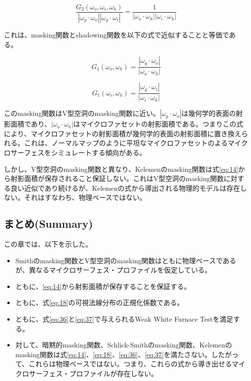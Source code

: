\documentclass[a4j,xelatex,ja=standard]{bxjsarticle}
\begin{document}
\begin{equation}
    \frac{G_2(\omega_o, \omega_i, \omega_h)}{|\omega_g \cdot \omega_o| |\omega_g \cdot \omega_i|} = \frac{1}{|\omega_o \cdot \omega_h| |\omega_i \cdot \omega_h|}
    \label{eq:58}
\end{equation}

これは、masking関数とshadowing関数を以下の式で近似することと等価である。

\begin{equation}
    G_1(\omega_o, \omega_h) = \frac{|\omega_g \cdot \omega_o|}{|\omega_o \cdot \omega_h|}
    \label{eq:59}
\end{equation}

\begin{equation}
    G_1(\omega_i, \omega_h) = \frac{|\omega_g \cdot \omega_i|}{|\omega_i \cdot \omega_h|}
    \label{eq:60}
\end{equation}

このmasking関数はV型空洞のmasking関数に近い。$|\omega_g \cdot \omega_o|$は幾何学的表面の射影面積であり、$|\omega_o \cdot \omega_h|$はマイクロファセットの射影面積である。つまりこの式により、マイクロファセットの射影面積が幾何学的表面の射影面積に置き換えられる。これは、ノーマルマップのように平坦なマイクロファセットのよるマイクロサーフェスをシミュレートする傾向がある。

しかし、V型空洞のmasking関数と異なり、Kelemenのmasking関数は式\eqref{eq:14}から射影面積が保存されること保証しない。これはV型空洞のmasking関数に対する良い近似であり続けるが、Kelemenの式から導出される物理的モデルは存在しない。それはすなわち、物理ベースではない。

\subsection{まとめ(Summary)}

この章では、以下を示した。

\begin{itemize}
    \item Smithのmasking関数とV型空洞のmasking関数はともに物理ベースであるが、異なるマイクロサーフェス・プロファイルを仮定している。
    \item ともに、\eqref{eq:14}から射影面積が保存することを保証する。
    \item ともに、式\eqref{eq:18}の可視法線分布の正規化係数である。
    \item ともに、式\eqref{eq:36}と\eqref{eq:37}で与えられるWeak White Furnace Testを満足する。
    \item 対して、暗黙的masking関数、Schlick-Smithのmasking関数、Kelemenのmasking関数は式\eqref{eq:14}、\eqref{eq:18}、\eqref{eq:36}、\eqref{eq:37}を満たさない。したがって、これらは物理ベースではない。つまり、これらの式から導き出せるマイクロサーフェス・プロファイルが存在しない。
\end{itemize}
\end{document}
